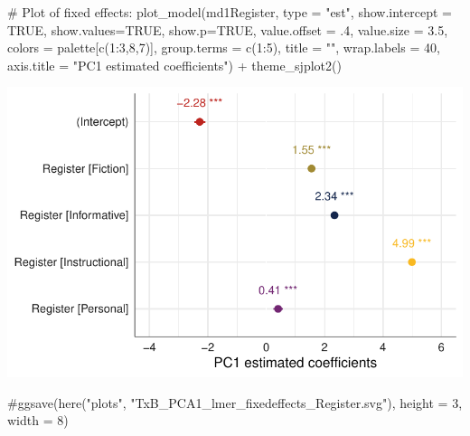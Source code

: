 \documentclass[
  letterpaper,
  DIV=11,
  numbers=noendperiod]{scrreprt}
\newenvironment{Shaded}{\begin{snugshade}}{\end{snugshade}}
\newcommand{\AttributeTok}[1]{\textcolor[rgb]{0.40,0.45,0.13}{#1}}
\newcommand{\CommentTok}[1]{\textcolor[rgb]{0.37,0.37,0.37}{#1}}
\newcommand{\ConstantTok}[1]{\textcolor[rgb]{0.56,0.35,0.01}{#1}}
\newcommand{\DecValTok}[1]{\textcolor[rgb]{0.68,0.00,0.00}{#1}}
\newcommand{\FloatTok}[1]{\textcolor[rgb]{0.68,0.00,0.00}{#1}}
\newcommand{\FunctionTok}[1]{\textcolor[rgb]{0.28,0.35,0.67}{#1}}
\newcommand{\NormalTok}[1]{\textcolor[rgb]{0.00,0.23,0.31}{#1}}
\newcommand{\SpecialCharTok}[1]{\textcolor[rgb]{0.37,0.37,0.37}{#1}}
\newcommand{\StringTok}[1]{\textcolor[rgb]{0.13,0.47,0.30}{#1}}
\begin{document}
\begin{Shaded}
\begin{Highlighting}[]
\CommentTok{\# Plot of fixed effects:}
\FunctionTok{plot\_model}\NormalTok{(md1Register, }
           \AttributeTok{type =} \StringTok{"est"}\NormalTok{,}
           \AttributeTok{show.intercept =} \ConstantTok{TRUE}\NormalTok{,}
           \AttributeTok{show.values=}\ConstantTok{TRUE}\NormalTok{, }
           \AttributeTok{show.p=}\ConstantTok{TRUE}\NormalTok{,}
           \AttributeTok{value.offset =}\NormalTok{ .}\DecValTok{4}\NormalTok{,}
           \AttributeTok{value.size =} \FloatTok{3.5}\NormalTok{,}
           \AttributeTok{colors =}\NormalTok{ palette[}\FunctionTok{c}\NormalTok{(}\DecValTok{1}\SpecialCharTok{:}\DecValTok{3}\NormalTok{,}\DecValTok{8}\NormalTok{,}\DecValTok{7}\NormalTok{)],}
           \AttributeTok{group.terms =} \FunctionTok{c}\NormalTok{(}\DecValTok{1}\SpecialCharTok{:}\DecValTok{5}\NormalTok{), }
           \AttributeTok{title =} \StringTok{""}\NormalTok{,}
           \AttributeTok{wrap.labels =} \DecValTok{40}\NormalTok{,}
           \AttributeTok{axis.title =} \StringTok{"PC1 estimated coefficients"}\NormalTok{) }\SpecialCharTok{+}
  \FunctionTok{theme\_sjplot2}\NormalTok{() }
\end{Highlighting}
\end{Shaded}

\includegraphics{E_Ch6_Analysis_files/figure-pdf/Dim1fixed-1.pdf}

\begin{Shaded}
\begin{Highlighting}[]
\CommentTok{\#ggsave(here("plots", "TxB\_PCA1\_lmer\_fixedeffects\_Register.svg"), height = 3, width = 8)}
\end{Highlighting}
\end{Shaded}
\end{document}

